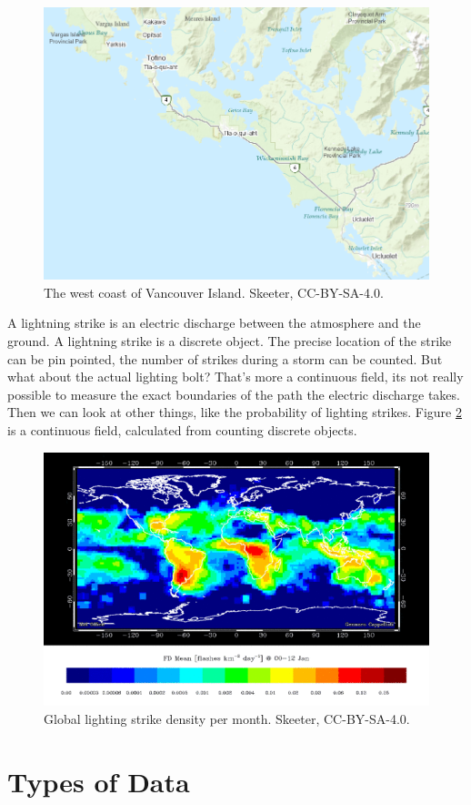 \documentclass[
]{book}
\begin{document}
\begin{figure}
\includegraphics[width=0.75\linewidth]{images/03-beach-small-scale} \caption{The west coast of Vancouver Island. Skeeter, CC-BY-SA-4.0.}\label{fig:3-beach-small-scale}
\end{figure}

A lightning strike is an electric discharge between the atmosphere and the ground. A lightning strike is a discrete object. The precise location of the strike can be pin pointed, the number of strikes during a storm can be counted. But what about the actual lighting bolt? That's more a continuous field, its not really possible to measure the exact boundaries of the path the electric discharge takes. Then we can look at other things, like the probability of lighting strikes. Figure \ref{fig:3-lightning-density} is a continuous field, calculated from counting discrete objects.

\begin{figure}
\includegraphics[width=0.75\linewidth]{images/03-lightning-density} \caption{Global lighting strike density per month. Skeeter, CC-BY-SA-4.0.}\label{fig:3-lightning-density}
\end{figure}

\hypertarget{types-of-data-1}{%
\section{Types of Data}\label{types-of-data-1}}
\end{document}
